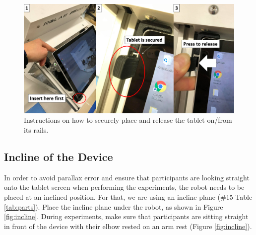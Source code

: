 \documentclass[10pt,oneside,a4paper]{article}
\begin{document}
\begin{figure}[h!]
\begin{center}
\includegraphics[width=\columnwidth]{images/Hardware/tabletPlacement.png}
\caption{Instructions on how to securely place and release the tablet on/from its rails.}
\label{fig:tabletPlacement}
\end{center}
\end{figure}

\subsection{Incline of the Device}
In order to avoid parallax error and ensure that participants are looking straight onto the tablet screen when performing the experiments, the robot needs to be placed at an inclined position. For that, we are using an incline plane (\#15 Table \ref{tab:parts}). Place the incline plane under the robot, as shown in Figure \ref{fig:incline}. During experiments, make sure that participants are sitting straight in front of the device with their elbow rested on an arm rest (Figure \ref{fig:incline}).
\end{document}
